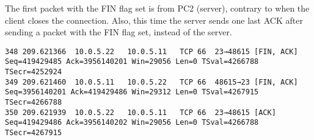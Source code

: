 The first packet with the FIN flag set is from PC2 (server), contrary to when the client closes the connection. Also, this time the server sends one last ACK after sending a packet with the FIN flag set, instead of the server.

\begin{lstlisting}
348	209.621366	10.0.5.22	10.0.5.11	TCP	66	23→48615 [FIN, ACK] Seq=419429485 Ack=3956140201 Win=29056 Len=0 TSval=4266788 TSecr=4252924
349	209.621460	10.0.5.11	10.0.5.22	TCP	66	48615→23 [FIN, ACK] Seq=3956140201 Ack=419429486 Win=29312 Len=0 TSval=4267915 TSecr=4266788
350	209.621939	10.0.5.22	10.0.5.11	TCP	66	23→48615 [ACK] Seq=419429486 Ack=3956140202 Win=29056 Len=0 TSval=4266788 TSecr=4267915
\end{lstlisting}